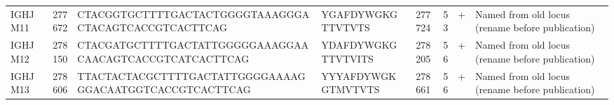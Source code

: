 \begin{tabular}{lrllrrll}
  IGHJM11 & 277672 & CTACGGTGCTTTTGACTACTGGGGTAAAGGGACTACAGTCACCGTCACTTCAG & YGAFDYWGKGTTVTVTS & 277724 & 53 & + & Named from old locus (rename before publication) \\ 
  IGHJM12 & 278150 & CTACGATGCTTTTGACTATTGGGGGAAAGGAACAACAGTCACCGTCATCACTTCAG & YDAFDYWGKGTTVTVITS & 278205 & 56 & + & Named from old locus (rename before publication) \\ 
  IGHJM13 & 278606 & TTACTACTACGCTTTTGACTATTGGGGAAAAGGGACAATGGTCACCGTCACTTCAG & YYYAFDYWGKGTMVTVTS & 278661 & 56 & + & Named from old locus (rename before publication) \\ 
   \bottomrule \end{tabular}
